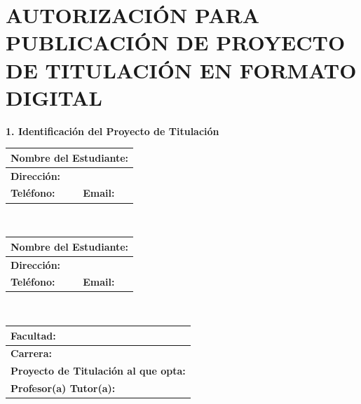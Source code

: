 \documentclass[12pt, a4paper, nofontenc, numbers=endperiod]{apa7}
\begin{document}
{			\section*{\footnotesize \centering  AUTORIZACIÓN PARA PUBLICACIÓN DE PROYECTO DE TITULACIÓN EN FORMATO DIGITAL}
			\vspace{-0.8cm}
			\justify
			{\singlespacing	
				\textbf{\footnotesize 1. Identificación del Proyecto de Titulación} 
				\vspace*{-0.1cm}
				\justify
				\begin{tabular}{|p{7cm}|p{8.05cm}|}
					\hline
					\multicolumn{2}{|l|}{\textbf{\footnotesize Nombre del Estudiante:}} \\
					\hline
					\multicolumn{2}{|l|}{\textbf{\footnotesize Dirección:}} \\
					\hline
					\textbf{\footnotesize Teléfono:} & \textbf{\footnotesize Email:} \\
					\hline
				\end{tabular}	\\[0.1cm]
				{\color{red}\begin{tabular}{|p{7cm}|p{8.05cm}|}
						\hline
						\multicolumn{2}{|l|}{\textbf{\footnotesize Nombre del Estudiante:}} \\
						\hline
						\multicolumn{2}{|l|}{\textbf{\footnotesize Dirección:}} \\
						\hline
						\textbf{\footnotesize Teléfono:} & \textbf{\footnotesize Email:} \\
						\hline
					\end{tabular} \\[-0.2cm]}
				\justify
				\begin{tabular}{|p{8cm}|p{8cm}|}
					\hline
					\multicolumn{2}{|p{15.5cm}|}{\textbf{\footnotesize Facultad:}} \\
					\hline
					\multicolumn{2}{|p{15.5cm}|}{\textbf{\footnotesize Carrera:}} \\
					\hline
					\multicolumn{2}{|p{15.5cm}|}{\textbf{\footnotesize Proyecto de Titulación al que opta:}} \\
					\hline
					\multicolumn{2}{|p{15.5cm}|}{\textbf{\footnotesize Profesor(a) Tutor(a):}} \\
					\hline
				\end{tabular} \\[-0.3cm]
				\justify	
				\begin{tabular}{|p{15.5cm}|}

\end{tabular}}}
\end{document}
